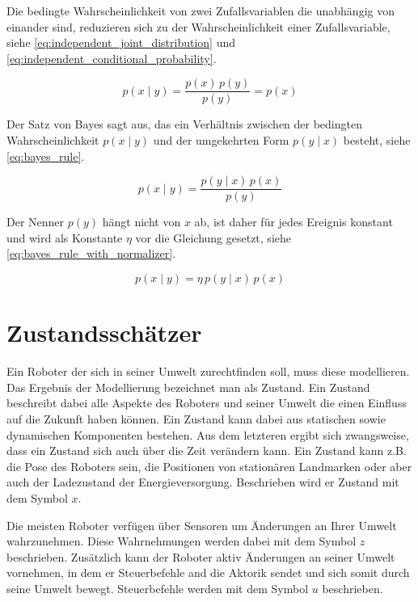 Die bedingte Wahrscheinlichkeit von zwei Zufallsvariablen die unabhängig von einander sind, reduzieren sich zu der Wahrscheinlichkeit einer Zufallsvariable, siehe \autoref{eq:independent_joint_distribution} und \autoref{eq:independent_conditional_probability}.

\begin{equation}
p(x \mid y) = \frac{p(x) \, p(y)}{p(y)} = p(x) \label{eq:independent_conditional_probability}
\end{equation}

Der Satz von Bayes sagt aus, das ein Verhältnis zwischen der bedingten Wahrscheinlichkeit $p(x \mid y)$ und der umgekehrten Form $p(y \mid x)$ besteht, siehe \autoref{eq:bayes_rule}.

\begin{equation}
p(x \mid y) = \frac{p(y \mid x) \, p(x)}{p(y)} \label{eq:bayes_rule}
\end{equation}

Der Nenner $p(y)$ hängt nicht von $x$ ab, ist daher für jedes Ereignis konstant und wird als Konstante $\eta$ vor die Gleichung gesetzt, siehe \autoref{eq:bayes_rule_with_normalizer}.

\begin{equation}
p(x \mid y) = \eta \, p(y \mid x) \, p(x) \label{eq:bayes_rule_with_normalizer}
\end{equation}


%
%
%
\section{Zustandsschätzer}

Ein Roboter der sich in seiner Umwelt zurechtfinden soll, muss diese modellieren. Das Ergebnis der Modellierung bezeichnet man als Zustand. Ein Zustand beschreibt dabei alle Aspekte des Roboters und seiner Umwelt die einen Einfluss auf die Zukunft haben können. Ein Zustand kann dabei aus statischen sowie dynamischen Komponenten bestehen. Aus dem letzteren ergibt sich zwangsweise, dass ein Zustand sich auch über die Zeit verändern kann. Ein Zustand kann z.B. die Pose des Roboters sein, die Positionen von stationären Landmarken oder aber auch der Ladezustand der Energieversorgung. Beschrieben wird er Zustand mit dem Symbol $x$.

Die meisten Roboter verfügen über Sensoren um Änderungen an Ihrer Umwelt wahrzunehmen. Diese Wahrnehmungen werden dabei mit dem Symbol $z$ beschrieben. Zusätzlich kann der Roboter aktiv Änderungen an seiner Umwelt vornehmen, in dem er Steuerbefehle and die Aktorik sendet und sich somit durch seine Umwelt bewegt. Steuerbefehle werden mit dem Symbol $u$ beschrieben.

